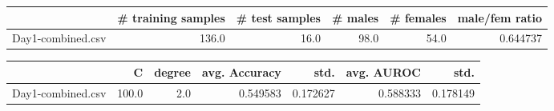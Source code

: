\begin{tabular}{lrrrrr}
\hline
{} &  \# training samples &  \# test samples &  \# males &  \# females &  male/fem ratio \\
\hline
Day1-combined.csv &               136.0 &            16.0 &     98.0 &       54.0 &        0.644737 \\
\hline
\end{tabular}
\begin{tabular}{lrrrrrr}
\hline
{} &      C &  degree &  avg. Accuracy &      std. &  avg. AUROC &      std. \\
\hline
Day1-combined.csv &  100.0 &     2.0 &       0.549583 &  0.172627 &    0.588333 &  0.178149 \\
\hline
\end{tabular}
